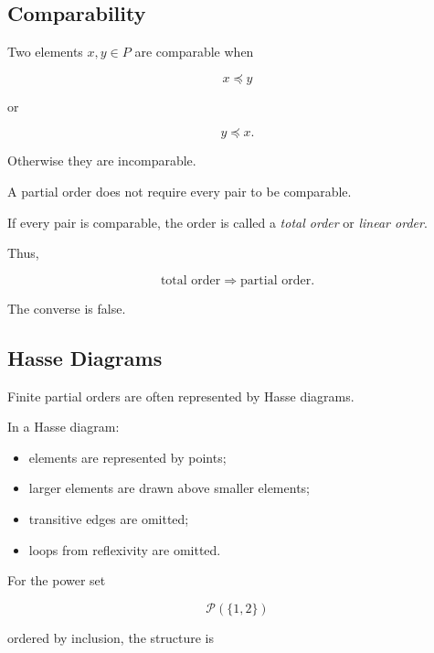 \subsection{Comparability}
\label{subsec:comparability}

Two elements \(x,y\in P\) are comparable when

\[
x\preceq y
\]

or

\[
y\preceq x.
\]

Otherwise they are incomparable.

A partial order does not require every pair to be comparable.

If every pair is comparable, the order is called a \emph{total order}
or \emph{linear order}.

Thus,

\[
\boxed{
\text{total order}
\Longrightarrow
\text{partial order}.
}
\]

The converse is false.

\subsection{Hasse Diagrams}
\label{subsec:hasse-diagrams-discrete}

Finite partial orders are often represented by Hasse diagrams.

In a Hasse diagram:

\begin{itemize}
    \item elements are represented by points;
    \item larger elements are drawn above smaller elements;
    \item transitive edges are omitted;
    \item loops from reflexivity are omitted.
\end{itemize}

For the power set

\[
\mathcal{P}(\{1,2\})
\]

ordered by inclusion, the structure is

\begin{centereddiagram}
\end{centereddiagram}

